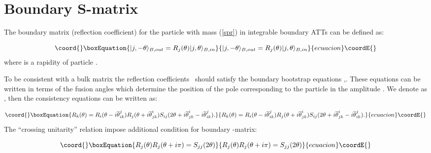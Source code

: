 \documentclass[a4paper,12pt,titlepage,final]{article}
\begin{document}
\section{Boundary S-matrix}

The boundary \coordHE{}matrix (reflection coefficient) for the particle \coordHE{} with
mass \coordHE{} (\ref{spr}) in integrable boundary ATTs can be defined as:

\begin{equation}\coord{}\boxEquation{
|j,-\theta \rangle _{B,out}=R_{j}(\theta )|j,\theta \rangle _{B,in}
\label{BS}
}{
|j,-\theta \rangle _{B,out}=R_{j}(\theta )|j,\theta \rangle _{B,in}
}{ecuacion}\coordE{}\end{equation}
where \myHighlight{$\theta $}\coordHE{} is a rapidity of particle \coordHE{}.

To be consistent with a bulk \coordHE{} matrix \coordHE{} the reflection
coefficients \coordHE{}\ should satisfy the boundary bootstrap
equations \cite{FK},\cite{GZ}. These equations can be written in terms of
the fusion angles \coordHE{} which determine the position of the
pole corresponding to the particle \coordHE{} in the amplitude \coordHE{}.
We denote as \coordHE{}, then the
consistency equations can be written as:

\begin{equation}\coord{}\boxEquation{
R_{k}(\theta )=R_{i}(\theta -i\overline{\theta }_{ik}^{j})R_{j}(\theta +
i\overline{\theta }_{jk}^{i})S_{ij}(2\theta +i\overline{\theta }_{jk}^{i}-
i\overline{\theta }_{ik}^{j}).  \label{Bb}
}{
R_{k}(\theta )=R_{i}(\theta -i\overline{\theta }_{ik}^{j})R_{j}(\theta +
i\overline{\theta }_{jk}^{i})S_{ij}(2\theta +i\overline{\theta }_{jk}^{i}-
i\overline{\theta }_{ik}^{j}).  }{ecuacion}\coordE{}\end{equation}
The ``crossing unitarity'' relation \cite{GZ} impose additional condition
for boundary \coordHE{}-matrix:

\begin{equation}\coord{}\boxEquation{
R_{j}(\theta )R_{j}(\theta +i\pi )=S_{jj}(2\theta )  \label{Cu}
}{
R_{j}(\theta )R_{j}(\theta +i\pi )=S_{jj}(2\theta )  }{ecuacion}\coordE{}\end{equation}
\end{document}
